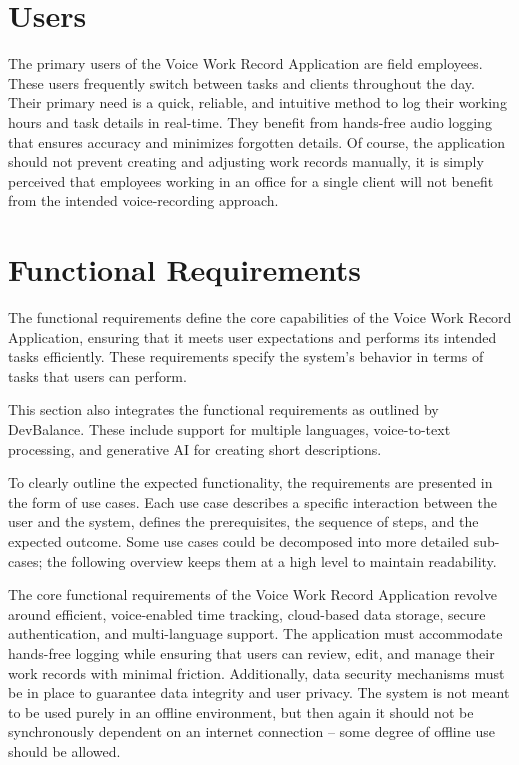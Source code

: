 \documentclass[
  digital,     %
  oneside,     %
  nosansbold,  %
  nocolorbold, %
  lof,         %
  lot,         %
]{fithesis4}
\begin{document}
\section{Users}

The primary users of the Voice Work Record Application are field employees. These users frequently switch between tasks and clients throughout the day. Their primary need is a quick, reliable, and intuitive method to log their working hours and task details in real-time. They benefit from hands-free audio logging that ensures accuracy and minimizes forgotten details. Of course, the application should not prevent creating and adjusting work records manually, it is simply perceived that employees working in an office for a single client will not benefit from the intended voice-recording approach.

\section{Functional Requirements}

The functional requirements define the core capabilities of the Voice Work Record Application, ensuring that it meets user expectations and performs its intended tasks efficiently. These requirements specify the system's behavior in terms of tasks that users can perform.

This section also integrates the functional requirements as outlined by DevBalance. These include support for multiple languages, voice-to-text processing, and generative \gls{AI} for creating short descriptions.

To clearly outline the expected functionality, the requirements are presented in the form of use cases. Each use case describes a specific interaction between the user and the system, defines the prerequisites, the sequence of steps, and the expected outcome. Some use cases could be decomposed into more detailed sub-cases; the following overview keeps them at a high level to maintain readability.

The core functional requirements of the Voice Work Record Application revolve around efficient, voice-enabled time tracking, cloud-based data storage, secure authentication, and multi-language support. The application must accommodate hands-free logging while ensuring that users can review, edit, and manage their work records with minimal friction. Additionally, data security mechanisms must be in place to guarantee data integrity and user privacy. The system is not meant to be used purely in an offline environment, but then again it should not be synchronously dependent on an internet connection – some degree of offline use should be allowed.
\end{document}

